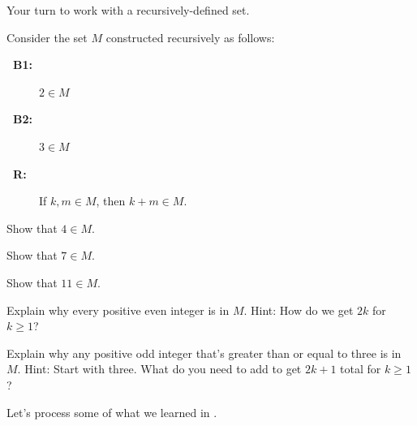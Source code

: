Your turn to work with a recursively-defined set.

\begin{act}
\label{act_coins_2and3}
    Consider the set $M$ constructed recursively as follows: 
        \begin{description}
            \item [\textbf{~\quad B1:}] $2 \in M$
            \item [\textbf{~\quad B2:}] $3 \in M$
            \item [\textbf{~\quad R:}] If $k,m \in M$, then $k+m \in M$.
        \end{description}   
        \begin{actpart}
            \item \label{part_coins_2and3_build4} Show that $4 \in M$.
            \item Show that $7 \in M$.
            \item Show that $11 \in M$.  
            \item Explain why every positive even integer is in $M$. Hint: How do we get $2k$ for $k \ge 1$?
            \item Explain why any positive odd integer that's greater than or equal to three is in $M$.  Hint: Start with three.  What do you need to add to get $2k+1$ total for $k \ge 1$?
        \end{actpart}
\end{act}

Let's process some of what we learned in .


